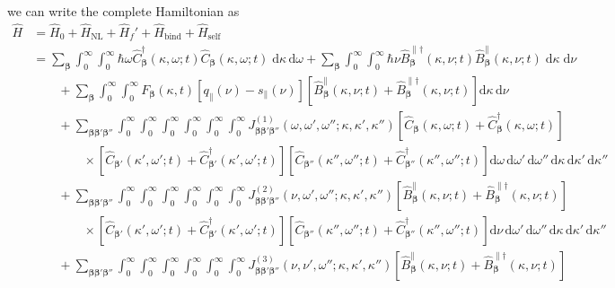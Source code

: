 \documentclass{article}
\begin{document}
we can write the complete Hamiltonian as
\begin{equation}
\begin{split}
\hat{H} &= \hat{H}_0 + \hat{H}_\mathrm{NL} + \hat{H}_f' + \hat{H}_\mathrm{bind} + \hat{H}_\mathrm{self}\\
&= \sum_{\bm{\beta}}\int_0^\infty\int_0^\infty\hbar\omega\hat{C}_{\bm{\beta}}^\dagger(\kappa,\omega;t)\hat{C}_{\bm{\beta}}(\kappa,\omega;t)\;\mathrm{d}\kappa\,\mathrm{d}\omega + \sum_{\bm{\beta}}\int_0^\infty\int_0^\infty\hbar\nu\hat{B}_{\bm{\beta}}^{\parallel\dagger}(\kappa,\nu;t)\hat{B}_{\bm{\beta}}^\parallel(\kappa,\nu;t)\;\mathrm{d}\kappa\;\mathrm{d}\nu\\
&\qquad + \sum_{\bm{\beta}}\int_0^\infty\int_0^\infty F_{\bm{\beta}}(\kappa,t)\left[q_\parallel(\nu) - s_\parallel(\nu)\right]\left[\hat{B}_{\bm{\beta}}^\parallel(\kappa,\nu;t) + \hat{B}_{\bm{\beta}}^{\parallel\dagger}(\kappa,\nu;t)\right]\mathrm{d}\kappa\,\mathrm{d}\nu\\
&\qquad + \sum_{\bm{\beta}\bm{\beta}'\bm{\beta}''}\int_0^\infty\int_0^\infty\int_0^\infty\int_0^\infty\int_0^\infty\int_0^\infty J_{\bm{\beta}\bm{\beta}'\bm{\beta}''}^{(1)}(\omega,\omega',\omega'';\kappa,\kappa',\kappa'')\left[\hat{C}_{\bm{\beta}}(\kappa,\omega;t) + \hat{C}_{\bm{\beta}}^\dagger(\kappa,\omega;t)\right]\\
&\qquad\qquad\times\left[\hat{C}_{\bm{\beta}'}(\kappa',\omega';t) + \hat{C}_{\bm{\beta}'}^\dagger(\kappa',\omega';t)\right]\left[\hat{C}_{\bm{\beta}''}(\kappa'',\omega'';t) + \hat{C}_{\bm{\beta}''}^\dagger(\kappa'',\omega'';t)\right]\mathrm{d}\omega\,\mathrm{d}\omega'\,\mathrm{d}\omega''\,\mathrm{d}\kappa\,\mathrm{d}\kappa'\,\mathrm{d}\kappa''\\[0.5em]
&\qquad + \sum_{\bm{\beta}\bm{\beta}'\bm{\beta}''}\int_0^\infty\int_0^\infty\int_0^\infty\int_0^\infty\int_0^\infty\int_0^\infty J_{\bm{\beta}\bm{\beta}'\bm{\beta}''}^{(2)}(\nu,\omega',\omega'';\kappa,\kappa',\kappa'')\left[\hat{B}_{\bm{\beta}}^\parallel(\kappa,\nu;t) + \hat{B}_{\bm{\beta}}^{\parallel\dagger}(\kappa,\nu;t)\right]\\
&\qquad\qquad\times\left[\hat{C}_{\bm{\beta}'}(\kappa',\omega';t) + \hat{C}_{\bm{\beta}'}^\dagger(\kappa',\omega';t)\right]\left[\hat{C}_{\bm{\beta}''}(\kappa'',\omega'';t) + \hat{C}_{\bm{\beta}''}^\dagger(\kappa'',\omega'';t)\right]\mathrm{d}\nu\,\mathrm{d}\omega'\,\mathrm{d}\omega''\,\mathrm{d}\kappa\,\mathrm{d}\kappa'\,\mathrm{d}\kappa''\\[0.5em]
&\qquad + \sum_{\bm{\beta}\bm{\beta}'\bm{\beta}''}\int_0^\infty\int_0^\infty\int_0^\infty\int_0^\infty\int_0^\infty\int_0^\infty J_{\bm{\beta}\bm{\beta}'\bm{\beta}''}^{(3)}(\nu,\nu',\omega'';\kappa,\kappa',\kappa'')\left[\hat{B}_{\bm{\beta}}^\parallel(\kappa,\nu;t) + \hat{B}_{\bm{\beta}}^{\parallel\dagger}(\kappa,\nu;t)\right]\\

\end{split}
\end{equation}
\end{document}
